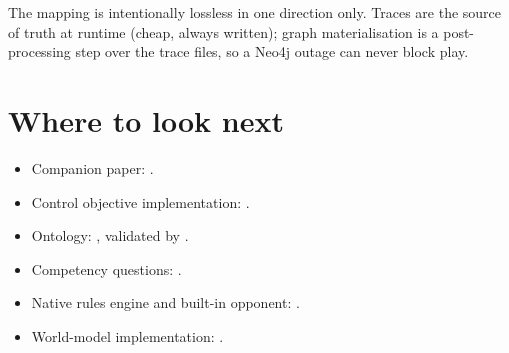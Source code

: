\documentclass[11pt,a4paper]{article}
\begin{document}
The mapping is intentionally lossless in one direction only. Traces are
the source of truth at runtime (cheap, always written); graph
materialisation is a post-processing step over the trace files, so a
Neo4j outage can never block play.

\section{Where to look next}
\begin{itemize}[leftmargin=*]
  \item Companion paper: .
  \item Control objective implementation: .
  \item Ontology: ,
        validated by .
  \item Competency questions: .
  \item Native rules engine and built-in opponent: \cite{phase2026engine}.
  \item World-model implementation: .
\end{itemize}

\renewcommand{\bibsection}{\section{References}}



\end{document}
